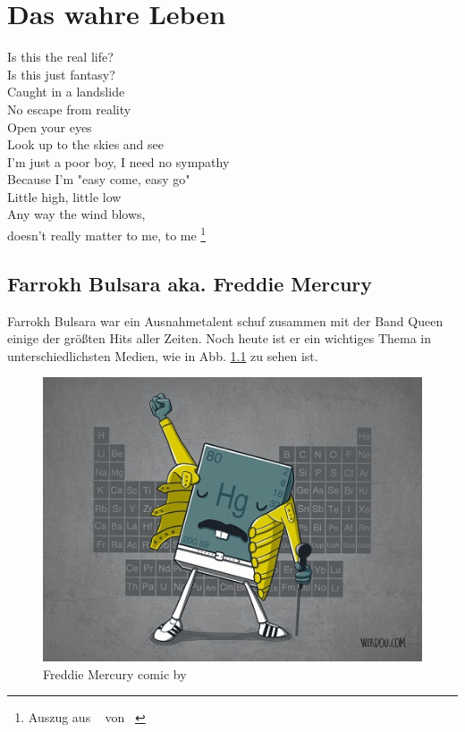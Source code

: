\chapter{Das wahre Leben}

\begin{center}
Is this the real life? \\
Is this just fantasy? \\
Caught in a landslide \\
No escape from reality \\
Open your eyes \\
Look up to the skies and see \\
I'm just a poor boy, I need no sympathy \\
Because I'm "{}easy come, easy go"{} \\ %
Little high, little low \\
Any way the wind blows, \\
doesn't really matter to me, 
to me \footnote{Auszug aus ~\cite{BohemRhap} von \citeauthor{Queen}~\cite{Queen} }\\
\end{center}

\section{Farrokh Bulsara aka. Freddie Mercury}

Farrokh Bulsara war ein Ausnahmetalent schuf zusammen mit der Band Queen einige der größten Hits aller Zeiten. Noch heute ist er ein wichtiges Thema in unterschiedlichsten Medien, wie in Abb. \ref{fig:freddiehg} zu sehen ist.
\begin{figure}
\begin{center} \includegraphics{figures/freddie_mercury_by_wirdoudesigns.jpg} \end{center}
\caption{Freddie Mercury comic by~\citeauthor{wirdou}~\cite{wirdou}}
\label{fig:freddiehg}
\end{figure}

\newpage